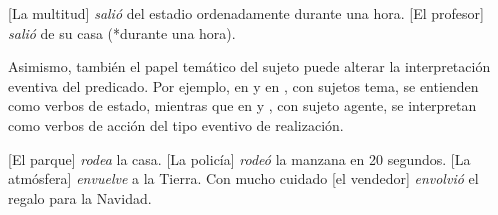 \begin{exe}
  \ex\label{ex:08-multitud} {}[La multitud] \textit{salió} del estadio
      ordenadamente durante una hora.
  \ex\label{ex:08-profesor} {}[El profesor] \textit{salió} de su casa (*durante
      una hora).
\end{exe}

Asimismo, también el papel temático del sujeto puede alterar la interpretación
eventiva del predicado. Por ejemplo,  en  y
 en , con sujetos tema, se entienden como
verbos de estado, mientras que en  y
, con sujeto agente, se interpretan como verbos de acción
del tipo eventivo de realización.

\begin{exe}
  \ex\label{ex:08-parque} {}[El parque] \textit{rodea} la casa.
  \ex\label{ex:08-policia} {}[La policía] \textit{rodeó} la manzana en 20
      segundos.
  \ex\label{ex:08-atmosfera} {}[La atmósfera] \textit{envuelve} a la Tierra.
  \ex\label{ex:08-vendedor} Con mucho cuidado [el vendedor] \textit{envolvió} el
      regalo para la Navidad.
\end{exe}

